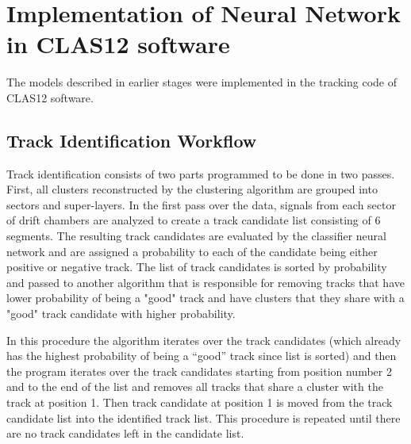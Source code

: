 \section{Implementation of Neural Network in CLAS12 software}

The models described in earlier stages were implemented in the tracking code of CLAS12 
software. 

\subsection{Track Identification Workflow}

 Track identification consists of two parts programmed to be done in two passes.
First, all clusters reconstructed by the clustering algorithm are grouped into sectors and super-layers.
In the first pass over the data, signals from each sector of drift chambers are analyzed to create a track 
candidate list consisting of 6 segments.
The resulting track candidates are evaluated by the classifier neural network and are assigned a probability to each 
of the candidate being either positive or negative track. The list of track candidates is sorted by probability and passed
to another algorithm that is responsible for removing tracks that have lower probability of being a "good" track and have
clusters that they share with a "good" track candidate with higher probability. 

In this procedure the algorithm iterates over the track candidates (which already has the highest probability of being a ``good'' track since list is sorted) and then the program iterates over the track candidates starting from position number 2 and to the end of the list and removes all tracks that share a 
cluster with the track at position 1. Then track candidate at position 1 is moved from the track candidate list into the identified
track list. This procedure is repeated until there are no track candidates left in the candidate list.


